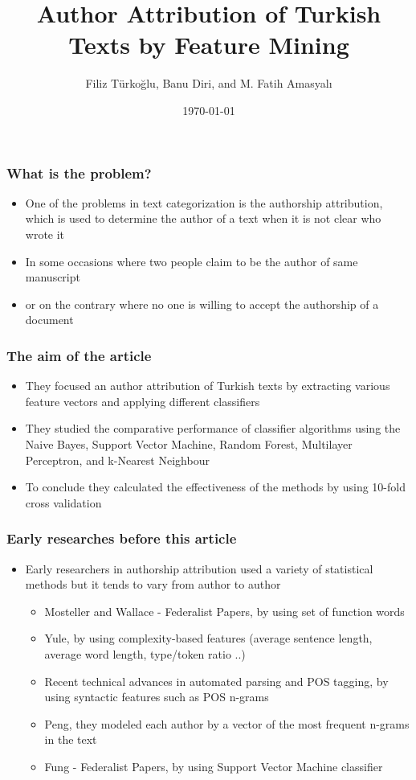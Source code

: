 \documentclass{beamer}
\title{Author Attribution of Turkish Texts by Feature Mining}
\author{Filiz Türkoğlu, Banu Diri, and M. Fatih Amasyalı}
\institute{Narrators: Mehmetcan Güleşçi, Furkan Karakoyunlu}
\date{\today}
\begin{document}
 \frame{\titlepage}
 
 \begin{frame}
  \frametitle{What is the problem?}
  \begin{itemize}
   \item One of the problems in text categorization is the authorship attribution, which is used to determine 
   the author of a text when it is not clear who wrote it
   \item In some occasions where two people claim to be the author of same manuscript 
   \item or on the contrary where no one is willing to accept the authorship of a document
  \end{itemize}
 \end{frame}
 
 \begin{frame}
  \frametitle{The aim of the article}
  \begin{itemize}
   \item They focused an author attribution of Turkish texts by extracting various feature vectors and applying 
   different classifiers
   \item They studied the comparative performance of classifier algorithms using the Naive Bayes, Support Vector 
   Machine, Random Forest, Multilayer Perceptron, and k-Nearest Neighbour
   \item To conclude they calculated the effectiveness of the methods by using 10-fold cross validation
  \end{itemize}
 \end{frame}

 \begin{frame}
  \frametitle{Early researches before this article}
  \begin{itemize}
   \item Early researchers in authorship attribution used a variety of statistical methods but it tends to vary 
   from author to author
   \begin{itemize}
    \item Mosteller and Wallace - Federalist Papers, by using set of function words
    \item Yule, by using complexity-based features (average sentence length, average word length, type/token 
    ratio ..)
    \item Recent technical advances in automated parsing and POS tagging, by using syntactic features such as 
    POS n-grams
    \item Peng, they modeled each author by a vector of the most frequent n-grams in the text
    \item Fung - Federalist Papers, by using Support Vector Machine classifier
   \end{itemize}
  \end{itemize}
 \end{frame}
 
\end{document}
